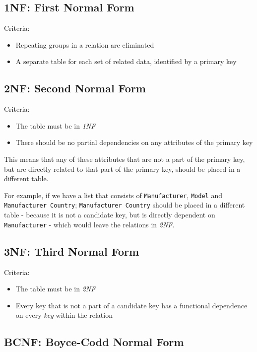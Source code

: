 \documentclass{article}
\begin{document}
\subsection{1NF: First Normal Form}

Criteria:

\begin{itemize}
  \item Repeating groups in a relation are eliminated
  \item A separate table for each set of related data, identified by a primary key
\end{itemize}

\subsection{2NF: Second Normal Form}

Criteria:

\begin{itemize}
\item
  The table must be in \textit{1NF}
\item
  There should be no partial dependencies on any attributes of the primary key
\end{itemize}

This means that any of these attributes that are not a part of the primary key, but are directly related to that part of the primary key, should be placed in a different table.

For example, if we have a list that consists of \texttt{Manufacturer}, \texttt{Model} and \texttt{Manufacturer Country}; \texttt{Manufacturer Country} should be placed in a different table - because it is not a candidate key, but is directly dependent on \texttt{Manufacturer} - which would leave the relations in \textit{2NF}.

\subsection{3NF: Third Normal Form}

Criteria:

\begin{itemize}
\item
  The table must be in \textit{2NF}
\item
  Every key that is not a part of a candidate key has a functional dependence on every \textit{key} within the relation
\end{itemize}

\subsection{BCNF: Boyce-Codd Normal Form}
\end{document}
